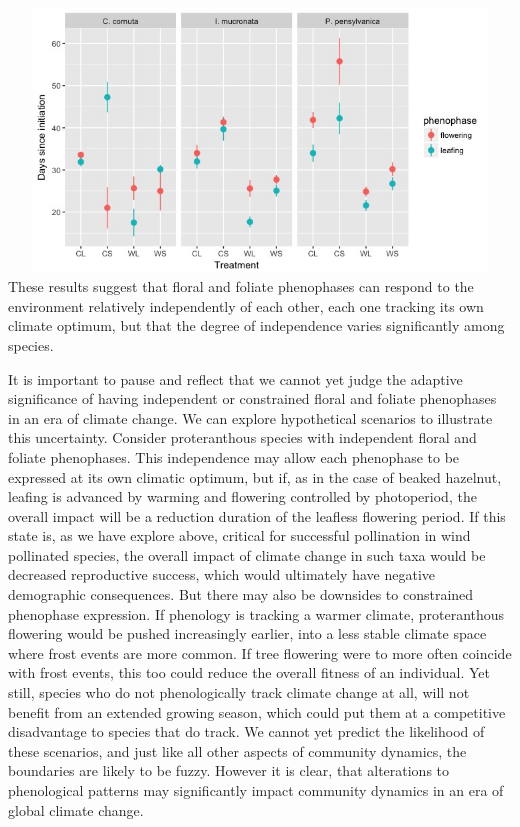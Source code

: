 \documentclass{article}\usepackage[]{graphicx}\usepackage[]{color}
\begin{document}
\includegraphics[width=16cm,height=7cm] {shrubs_4_csee}\\
These results suggest that floral and foliate phenophases can respond to the environment relatively independently of each other, each one tracking its own climate optimum, but that the degree of independence varies significantly among species. 
\par It is important to pause and reflect that we cannot yet judge the adaptive significance of having independent or constrained floral and foliate phenophases in an era of climate change. We can explore hypothetical scenarios to illustrate this uncertainty. Consider proteranthous species with independent floral and foliate phenophases. This independence may allow each phenophase to be expressed at its own climatic optimum, but if, as in the case of beaked hazelnut, leafing is advanced by warming and flowering controlled by photoperiod, the overall impact will be a reduction duration of the leafless flowering period. If this state is, as we have explore above, critical for successful pollination in wind pollinated species, the overall impact of climate change in such taxa would be decreased reproductive success, which would ultimately have negative demographic consequences. But there may also be downsides to constrained phenophase expression. If phenology is tracking a warmer climate, proteranthous flowering would be pushed increasingly earlier, into a less stable climate space where frost events are more common. If tree flowering were to more often coincide with frost events, this too could reduce the overall fitness of an individual. Yet still, species who do not phenologically track climate change at all, will not benefit from an extended growing season, which could put them at a competitive disadvantage to species that do track. We cannot yet predict the likelihood of these scenarios, and just like all other aspects of community dynamics, the boundaries are likely to be fuzzy. However it is clear, that alterations to phenological patterns may significantly impact community dynamics in an era of global climate change.
\end{document}
